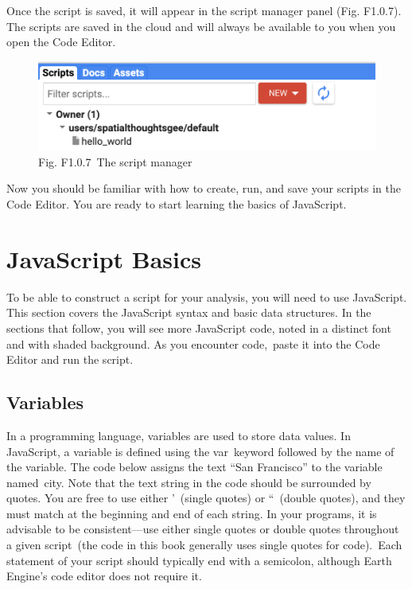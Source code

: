 \documentclass[
  letterpaper,
  DIV=11,
  numbers=noendperiod]{scrreprt}
\begin{document}
Once the script is saved, it will appear in the script manager panel
(Fig. F1.0.7). The scripts are saved in the cloud and will always be
available to you when you open the Code Editor.

\begin{figure}

{\centering \includegraphics{./F1/image24.png}

}

\caption{Fig. F1.0.7~The script manager}

\end{figure}

Now you should be familiar with how to create, run, and save your
scripts in the Code Editor. You are ready to start learning the basics
of JavaScript.

\hypertarget{javascript-basics}{%
\section{JavaScript Basics}\label{javascript-basics}}

To be able to construct a script for your analysis, you will need to use
JavaScript. This section covers the JavaScript syntax and basic data
structures. In the sections that follow, you will see more JavaScript
code, noted in a distinct font and with shaded background. As you
encounter code,~paste it into the Code Editor and run the script.

\hypertarget{variables}{%
\subsection*{Variables}\label{variables}}

In a programming language, variables are used to store data values. In
JavaScript, a variable is defined using the var~keyword followed by the
name of the variable. The code below assigns the text ``San Francisco''
to the variable named~city. Note that the text string in the code should
be surrounded by quotes. You are free to use either '~(single quotes) or
``~(double quotes), and they must match at the beginning and end of each
string. In your programs, it is advisable to be consistent---use either
single quotes or double quotes throughout a given script~(the code in
this book generally uses single quotes for code).~Each statement of your
script should typically end with a semicolon, although Earth Engine's
code editor does not require it.~
\end{document}
